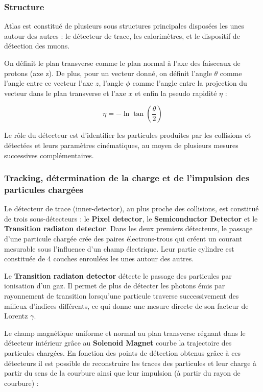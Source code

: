 \documentclass[11pt]{article} %
\begin{document}
\subsubsection{Structure}

Atlas est constitué de plusieurs sous structures principales disposées les unes autour des autres : le détecteur de trace, les calorimètres, et le dispositif de détection des muons.

On définit le plan transverse comme le plan normal à l'axe des faisceaux de protons (axe z).
De plus, pour un vecteur donné, on définit l'angle $\theta$ comme l'angle entre ce vecteur l'axe $z$,  l'angle $\phi$ comme l'angle entre la projection du vecteur dans le plan transverse et l'axe $x$ et enfin la pseudo rapidité $\eta$ :

\begin{equation}
\eta = -\ln \tan \left (\dfrac{\theta}{2} \right)
\end{equation}

Le rôle du détecteur est d'identifier les particules produites par les collisions et détectées et  leurs paramètres cinématiques, au moyen de plusieurs mesures successives complémentaires.

\subsubsection{Tracking, détermination de la charge et de l'impulsion des particules chargées}

Le détecteur de trace (inner-detector), au plus proche des collisions, est constitué de trois sous-détecteurs : le \textbf{Pixel detector}, le \textbf{Semiconductor Detector} et le \textbf{Transition radiaton detector}. Dans les deux premiers détecteurs, le passage d'une particule chargée crée des paires électrons-trous qui créent un courant mesurable sous l'influence d'un champ électrique. Leur partie cylindre est constituée de 4 couches enroulées les unes autour des autres.

Le \textbf{Transition radiaton detector} détecte le passage des particules par ionisation d'un gaz. Il permet de plus de détecter les photons émis par rayonnement de transition lorsqu'une particule traverse successivement des milieux d'indices différents, ce qui donne une mesure directe de son facteur de Lorentz $\gamma$.

Le champ magnétique uniforme et normal au plan transverse régnant dans le détecteur  intérieur  grâce au \textbf{Solenoid Magnet} courbe la trajectoire des particules chargées. En fonction des points de détection obtenus grâce à ces détecteurs il est possible de reconstruire les traces des particules et leur charge à partir du sens de la courbure ainsi que leur impulsion (à partir du rayon de courbure) :
\end{document}
